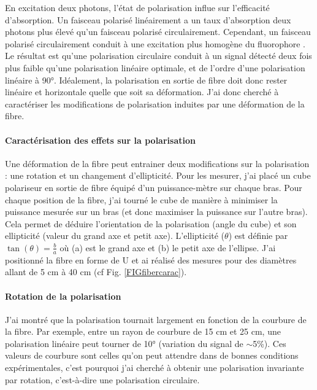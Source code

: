 En excitation deux photons, l'état de polarisation influe sur l'efficacité d'absorption. Un faisceau polarisé linéairement a un taux d'absorption deux photons plus élevé qu'un faisceau polarisé circulairement. Cependant, un faisceau polarisé circulairement conduit à une excitation plus homogène du fluorophore \cite{de_vito_effects_2020}. Le résultat est qu'une polarisation circulaire conduit à un signal détecté deux fois plus faible qu'une polarisation linéaire optimale, et de l'ordre d'une polarisation linéaire à 90°. Idéalement, la polarisation en sortie de fibre doit donc rester linéaire et horizontale quelle que soit sa déformation. J'ai donc cherché à caractériser les modifications de polarisation induites par une déformation de la fibre.


\paragraph{Caractérisation des effets sur la polarisation}

Une déformation de la fibre peut entrainer deux modifications sur la polarisation : une rotation et un changement d'ellipticité. Pour les mesurer, j'ai placé un cube polariseur en sortie de fibre équipé d'un puissance-mètre sur chaque bras. Pour chaque position de la fibre, j'ai tourné le cube de manière à minimiser la puissance mesurée sur un bras (et donc maximiser la puissance sur l'autre bras). Cela permet de déduire l'orientation de la polarisation (angle du cube) et son ellipticité (valeur du grand axe et petit axe). L'ellipticité ($\theta$) est définie par $\tan(\theta)=\frac{b}{a}$ où (a) est le grand axe et (b) le petit axe de l'ellipse. J'ai positionné la fibre en forme de U et ai réalisé des mesures pour des diamètres allant de 5 cm à 40 cm (cf Fig. \ref{FIGfibercarac}).

\paragraph{Rotation de la polarisation}

J'ai montré que la polarisation tournait largement en fonction de la courbure de la fibre. Par exemple, entre un rayon de courbure de 15 cm et 25 cm, une polarisation linéaire peut tourner de 10° (variation du signal de $\sim$5\%). Ces valeurs de courbure sont celles qu'on peut attendre dans de bonnes conditions expérimentales, c'est pourquoi j'ai cherché à obtenir une polarisation invariante par rotation, c'est-à-dire une polarisation circulaire.


